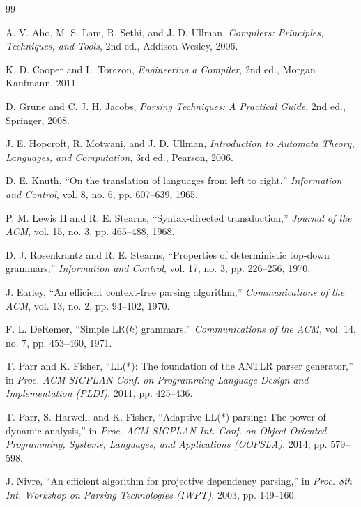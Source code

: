 \documentclass[12pt,a4paper]{article}
\begin{document}
\newpage
\begin{thebibliography}{99}

A. V. Aho, M. S. Lam, R. Sethi, and J. D. Ullman,
\textit{Compilers: Principles, Techniques, and Tools}, 2nd ed.,
Addison-Wesley, 2006.

K. D. Cooper and L. Torczon,
\textit{Engineering a Compiler}, 2nd ed., Morgan Kaufmann, 2011.

D. Grune and C. J. H. Jacobs,
\textit{Parsing Techniques: A Practical Guide}, 2nd ed., Springer, 2008.

J. E. Hopcroft, R. Motwani, and J. D. Ullman,
\textit{Introduction to Automata Theory, Languages, and Computation},
3rd ed., Pearson, 2006.

D. E. Knuth,
``On the translation of languages from left to right,''
\textit{Information and Control}, vol. 8, no. 6, pp. 607--639, 1965.

P. M. Lewis II and R. E. Stearns,
``Syntax-directed transduction,''
\textit{Journal of the ACM}, vol. 15, no. 3, pp. 465--488, 1968.

D. J. Rosenkrantz and R. E. Stearns,
``Properties of deterministic top-down grammars,''
\textit{Information and Control}, vol. 17, no. 3, pp. 226--256, 1970.

J. Earley,
``An efficient context-free parsing algorithm,''
\textit{Communications of the ACM}, vol. 13, no. 2, pp. 94--102, 1970.

F. L. DeRemer,
``Simple LR($k$) grammars,''
\textit{Communications of the ACM}, vol. 14, no. 7, pp. 453--460, 1971.

T. Parr and K. Fisher,
``LL(*): The foundation of the ANTLR parser generator,''
in \textit{Proc. ACM SIGPLAN Conf. on Programming Language Design and
Implementation (PLDI)}, 2011, pp. 425--436.

T. Parr, S. Harwell, and K. Fisher,
``Adaptive LL(*) parsing: The power of dynamic analysis,''
in \textit{Proc. ACM SIGPLAN Int. Conf. on Object-Oriented Programming,
Systems, Languages, and Applications (OOPSLA)}, 2014, pp. 579--598.

J. Nivre,
``An efficient algorithm for projective dependency parsing,''
in \textit{Proc. 8th Int. Workshop on Parsing Technologies (IWPT)}, 2003,
pp. 149--160.


\end{thebibliography}
\end{document}
